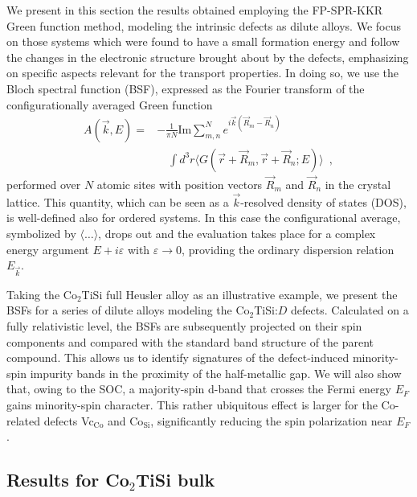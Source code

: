 \documentclass[aps,prb,twocolumn,superscriptaddress,showpacs]{revtex4}
\newcommand{\bm}[1]{\mbox{\boldmath$#1$}}
\begin{document}
We present in this section the results obtained employing the
FP-SPR-KKR Green function method, modeling the intrinsic
defects as dilute alloys. We focus on those systems which
were found to have a small formation energy and follow
the changes in the electronic structure brought about
by the defects, emphasizing on specific aspects relevant 
for the transport properties. In doing so, we use the  
Bloch spectral function (BSF),\cite{FS80} 
expressed as the Fourier transform of the configurationally 
averaged Green function
\begin{equation}\label{BSFdefine}
  \begin{aligned}
A(\vec k,E) = & -\frac{1}{\pi N}\text{Im}\sum_{m,n}^N 
                  e^{i\vec k({\vec R}_m  -{\vec R}_n)}\\
              & \quad\int\!d^3 r\langle G(\vec r + {\vec R}_m,
                         \vec r + {\vec R}_n;E)\rangle\enspace,
  \end{aligned}
\end{equation}
performed over $N$ atomic sites with position vectors
${\vec R}_m$ and ${\vec R}_n$ in the crystal lattice. 
This quantity, which can be seen as a $\vec k$-resolved density of states (DOS),
is well-defined also for ordered systems. In this case 
the configurational average, symbolized by $\langle\ldots\rangle$,
drops out and the evaluation takes place for a complex
energy argument $E+i\varepsilon$ with $\varepsilon\to0$,
providing the ordinary dispersion relation $E_{\vec k}$.


Taking the Co$_2$TiSi full Heusler alloy as an 
illustrative example,
we present the BSFs for a series of dilute alloys
modeling the Co$_2$TiSi:$D$ defects. Calculated
on a fully relativistic level, the BSFs are subsequently
projected on their spin components and 
compared with the standard band structure of the parent compound.
This allows us to identify signatures of the defect-induced
minority-spin impurity bands in the proximity of 
the half-metallic gap. We will also show that,
owing to the SOC, a majority-spin d-band that crosses 
the Fermi energy $E_F$ gains minority-spin character.
This rather ubiquitous effect is larger
for the Co-related defects 
Vc$_\text{Co}$ and Co$_\text{Si}$,
significantly reducing the spin polarization near $E_F$.

\subsection{Results for Co\bm{_2}TiSi bulk}
\end{document}
